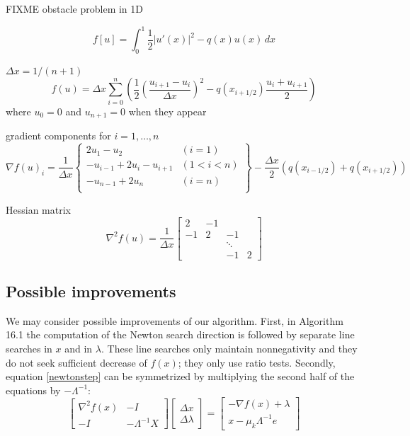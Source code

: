 \documentclass[11pt]{article}
\newcommand{\grad}{\nabla}
\begin{document}
FIXME obstacle problem in 1D

\begin{equation}
    f[u] = \int_0^1 \frac{1}{2} |u'(x)|^2 - q(x) u(x)\,dx \label{obstaclefunctional}
\end{equation}

$\Delta x = 1 / (n+1)$
\begin{equation}
    f(u) = \Delta x \sum_{i=0}^n \left(\frac{1}{2} \left(\frac{u_{i+1}-u_i}{\Delta x}\right)^2 - q(x_{i+1/2}) \frac{u_i + u_{i+1}}{2}\right) \label{obstacleobjective}
\end{equation}
where $u_0=0$ and $u_{n+1}=0$ when they appear

gradient components for $i=1,\dots,n$
\begin{equation}
\grad f(u)_i = \frac{1}{\Delta x} \left\{\begin{matrix}
2 u_1 - u_2 & (i=1) \\
-u_{i-1} + 2 u_i - u_{i+1} & (1<i<n) \\
-u_{n-1} + 2 u_n & (i=n) \\
\end{matrix} \right\} - \frac{\Delta x}{2} (q(x_{i-1/2}) + q(x_{i+1/2}))
\end{equation}

Hessian matrix
\begin{equation}
\grad^2 f(u) = \frac{1}{\Delta x} \begin{bmatrix}
2  & -1 &    &    \\
-1 &  2 & -1 &    \\
   &    & \ddots &\\
   &    & -1 &  2
\end{bmatrix}
\end{equation}

\subsection*{Possible improvements}

We may consider possible improvements of our algorithm.  First, in Algorithm 16.1 the computation of the Newton search direction is followed by separate line searches in $x$ and in $\lambda$.  These line searches only maintain nonnegativity and they do not seek sufficient decrease of $f(x)$; they only use ratio tests.  Secondly, equation \eqref{newtonstep} can be symmetrized by multiplying the second half of the equations by $-\Lambda^{-1}$:
\begin{equation}
\begin{bmatrix}
\grad^2 f(x) & - I \\
-I & - \Lambda^{-1} X
\end{bmatrix}
\begin{bmatrix}
\Delta x \\
\Delta \lambda
\end{bmatrix}
=
\begin{bmatrix}
-\grad f(x) + \lambda \\
x - \mu_k \Lambda^{-1} e
\end{bmatrix}
 \label{symmnewtonstep}
\end{equation}
\end{document}

